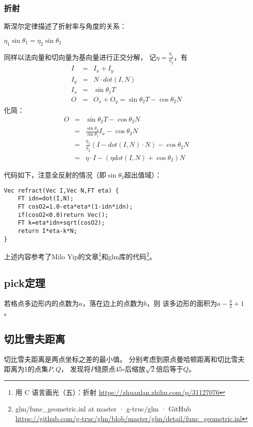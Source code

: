 \subsubsection{折射}
斯涅尔定律描述了折射率与角度的关系：
\begin{theorem}
    $\eta_1\sin \theta_1=\eta_2\sin \theta_2$
\end{theorem}
同样以法向量和切向量为基向量进行正交分解，
记$\eta=\frac{\eta_1}{\eta_2}$，有
\begin{eqnarray*}
    I&=&I_x+I_y\\
    I_y&=&N\cdot dot(I,N)\\
    I_x&=&\sin \theta_1T\\
    O&=&O_x+O_y=\sin \theta_2T-\cos \theta_2N
\end{eqnarray*}
化简：
\begin{eqnarray*}
    O&=&\sin \theta_2T-\cos \theta_2N\\
    &=&\frac{\sin \theta_2}{\sin \theta_1}I_x - \cos \theta_2 N\\
    &=&\frac{\eta_1}{\eta_2}(I-dot(I,N)\cdot N)-\cos \theta_2 N\\
    &=&\eta\cdot I-(\eta dot(I,N)+\cos \theta_2)N
\end{eqnarray*}

代码如下，注意全反射的情况（即$\sin \theta_2$超出值域）：
\begin{lstlisting}
Vec refract(Vec I,Vec N,FT eta) {
    FT idn=dot(I,N);
    FT cosO2=1.0-eta*eta*(1-idn*idn);
    if(cosO2<0.0)return Vec();
    FT k=eta*idn+sqrt(cosO2);
    return I*eta-k*N;
}
\end{lstlisting}
上述内容参考了Milo Yip的文章\footnote{
    用 C 语言画光（五）：折射
    \url{https://zhuanlan.zhihu.com/p/31127076}
}和glm库的代码\footnote{
    glm/func\_geometric.inl at master · g-truc/glm · GitHub
    \url{https://github.com/g-truc/glm/blob/master/glm/detail/func\_geometric.inl}
}。
\subsection{pick定理}
\begin{theorem}
    若格点多边形内的点数为$a$，落在边上的点数为$b$，则
    该多边形的面积为$a-\frac{b}{2}+1$。
\end{theorem}
\subsection{切比雪夫距离}
切比雪夫距离是两点坐标之差的最小值。
分别考虑到原点曼哈顿距离和切比雪夫距离为1的点集$P,Q$，
发现将$P$绕原点45$\circ$后缩放$\sqrt{2}$倍后等于$Q$。

